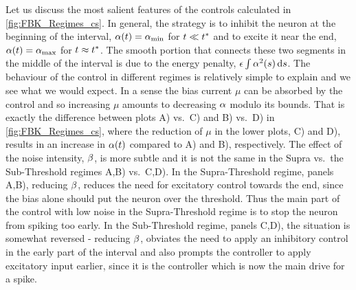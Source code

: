 \documentclass[12pt]{iopart}
\begin{document}
Let us discuss the most salient features of the controls calculated in
\cref{fig:FBK_Regimes_cs}. In general, the strategy is to inhibit the neuron at
the beginning of the interval, ${\alpha}(t) = { {\alpha}_{\textrm{min}} }$ for $t \ll { t^* }$ and to excite it
near the end, ${\alpha}(t) = { {\alpha}_{\textrm{max}} }$ for $t \approx { t^* }$. The smooth portion that connects these
two segments in the middle of the interval is due to the energy penalty, ${\epsilon} \int
{\alpha}^2(s) \, \mathrm{d} s$. The behaviour of the control in different regimes
is relatively simple to explain and we see what we would expect. In a
sense the bias current $\mu$ can be absorbed by the control and so increasing
$\mu$ amounts to decreasing ${\alpha}$ modulo its bounds. That is exactly the
difference between plots A) vs.\ C) and B) vs.\ D) in \cref{fig:FBK_Regimes_cs},
where the reduction of $\mu$ in the lower plots, C) and D), results in an
increase in ${\alpha}(t)$ compared to A) and B), respectively. The effect of the noise
intensity, ${\beta}$, is more subtle and it is not the same in the Supra vs.\ the
Sub-Threshold regimes A,B) vs.\ C,D). In the Supra-Threshold regime,  panels
A,B), reducing ${\beta}$, reduces the need for excitatory  control towards the end,
since the bias alone should put the neuron over the threshold. Thus the main
part of the control with low noise in the Supra-Threshold regime is to stop the
neuron from spiking too early. In the Sub-Threshold regime, panels C,D), the
situation is somewhat reversed - reducing ${\beta}$, obviates the need to apply an
inhibitory control in the early part of the interval and also prompts the
controller to apply excitatory input earlier, since it is the controller which
is now the main drive for a spike.
\end{document}
